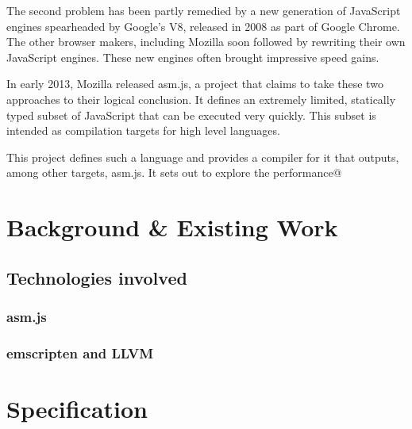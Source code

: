 \documentclass[11pt]{report}
\begin{document}
The second problem has been partly remedied by a new generation of JavaScript engines spearheaded by Google's V8, released in 2008 as part of Google Chrome. The other browser makers, including Mozilla soon followed by rewriting their own JavaScript engines. These new engines often brought impressive speed gains.

In early 2013, Mozilla released asm.js, a project that claims to take these two approaches to their logical conclusion. It defines an extremely limited, statically typed subset of JavaScript that can be executed very quickly. This subset is intended as compilation targets for high level languages.

This project defines such a language and provides a compiler for it that outputs, among other targets, asm.js. It sets out to explore the performance@

\chapter{Background \& Existing Work}
\section{Technologies involved}
\subsection{asm.js}
\subsection{emscripten and LLVM}

\chapter{Specification}
\end{document}

